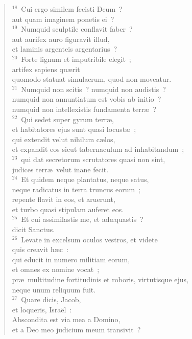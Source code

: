 \begin{verse}${}^{18}$~Cui ergo similem fecisti Deum~?\\ aut quam imaginem ponetis ei~?\\
${}^{19}$~Numquid sculptile conflavit faber~?\\ aut aurifex auro figuravit illud,\\ et laminis argenteis argentarius~?\\
${}^{20}$~Forte lignum et imputribile elegit~;\\ artifex sapiens qu\ae rit\\ quomodo statuat simulacrum, quod non moveatur.\\
${}^{21}$~Numquid non scitis~? numquid non audistis~?\\ numquid non annuntiatum est vobis ab initio~?\\ numquid non intellexistis fundamenta terr\ae~?\\
${}^{22}$~Qui sedet super gyrum terr\ae ,\\ et habitatores ejus sunt quasi locust\ae~;\\ qui extendit velut nihilum c\ae los,\\ et expandit eos sicut tabernaculum ad inhabitandum~;\\
${}^{23}$~qui dat secretorum scrutatores quasi non sint,\\ judices terr\ae\ velut inane fecit.\\
${}^{24}$~Et quidem neque plantatus, neque satus,\\ neque radicatus in terra truncus eorum~;\\ repente flavit in eos, et aruerunt,\\ et turbo quasi stipulam auferet eos.\\
${}^{25}$~Et cui assimilastis me, et ad\ae quastis~?\\ dicit Sanctus.\\
${}^{26}$~Levate in excelsum oculos vestros, et videte\\ quis creavit h\ae c~:\\ qui educit in numero militiam eorum,\\ et omnes ex nomine vocat~;\\ pr\ae\ multitudine fortitudinis et roboris, virtutisque ejus,\\ neque unum reliquum fuit.\\
${}^{27}$~Quare dicis, Jacob,\\ et loqueris, Isra\"el~:\\ Abscondita est via mea a Domino,\\ et a Deo meo judicium meum transivit~?\\

\end{verse}

